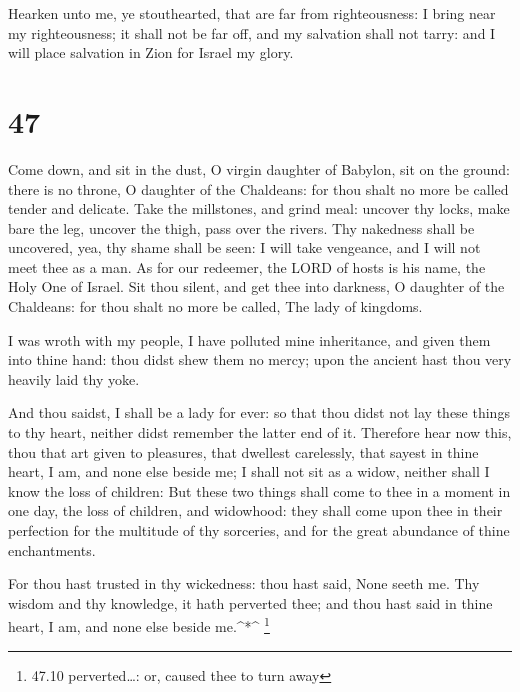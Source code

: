  Hearken unto me, ye stouthearted, that are far from
righteousness:  I bring near my righteousness; it shall not
be far off, and my salvation shall not tarry: and I will place salvation
in Zion for Israel my glory.

\hypertarget{section-46}{%
\section{47}\label{section-46}}

 Come down, and sit in the dust, O virgin daughter of
Babylon, sit on the ground: there is no throne, O daughter of the
Chaldeans: for thou shalt no more be called tender and delicate.
 Take the millstones, and grind meal: uncover thy locks,
make bare the leg, uncover the thigh, pass over the rivers. 
Thy nakedness shall be uncovered, yea, thy shame shall be seen: I will
take vengeance, and I will not meet thee as a man.  As for
our redeemer, the LORD of hosts is his name, the Holy One of Israel.
 Sit thou silent, and get thee into darkness, O daughter of
the Chaldeans: for thou shalt no more be called, The lady of kingdoms.

 I was wroth with my people, I have polluted mine
inheritance, and given them into thine hand: thou didst shew them no
mercy; upon the ancient hast thou very heavily laid thy yoke.

 And thou saidst, I shall be a lady for ever: so that thou
didst not lay these things to thy heart, neither didst remember the
latter end of it.  Therefore hear now this, thou that art
given to pleasures, that dwellest carelessly, that sayest in thine
heart, I am, and none else beside me; I shall not sit as a widow,
neither shall I know the loss of children:  But these two
things shall come to thee in a moment in one day, the loss of children,
and widowhood: they shall come upon thee in their perfection for the
multitude of thy sorceries, and for the great abundance of thine
enchantments.

 For thou hast trusted in thy wickedness: thou hast said,
None seeth me. Thy wisdom and thy knowledge, it hath perverted thee; and
thou hast said in thine heart, I am, and none else beside me.\^{}*\^{}
\footnote{47.10 perverted\ldots: or, caused thee to turn away}

